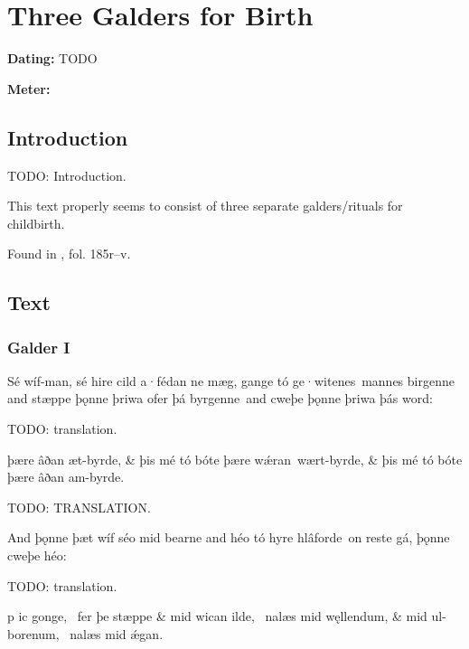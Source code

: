 \section{Three Galders for Birth}\chapterStart{}

\begin{flushright}%
\textbf{Dating:} TODO

\textbf{Meter:} \Fornyrdislag%
\end{flushright}

\subsection{Introduction}

TODO: Introduction.

This text properly seems to consist of three separate galders/rituals for childbirth.

Found in \Lacnunga, fol. 185r--v.

\sectionline

\subsection{Text}

\subsubsection{Galder I}%
\chapterStart{}

\bpg\bpa Sé wíf-man, sé hire cild a·fédan ne mæg, gange tó ge·witenes mannes birgenne and stæppe þǫnne þriwa ofer þá byrgenne and cweþe þǫnne þriwa þás word:\epa

\bpb TODO: translation.\epb\epg

\bvg\bva%
 þære âðan æt-byrde, &
þis mé tó bóte þære wǽran wært-byrde, &
þis mé tó bóte þære âðan am-byrde.\eva

\bvb TODO: TRANSLATION.\evb\evg

\bpg\bpa And þǫnne þæt wíf séo mid bearne and héo tó hyre hlâforde on reste gá, þǫnne cweþe héo:\epa

\bpb TODO: translation.\epb\epg

\bvg\bva {}p ic gonge, \hld\ fer þe stæppe &
mid wican ilde, \hld\ nalæs mid węllendum, &
mid ul-borenum, \hld\ nalæs mid ǽgan.\eva

